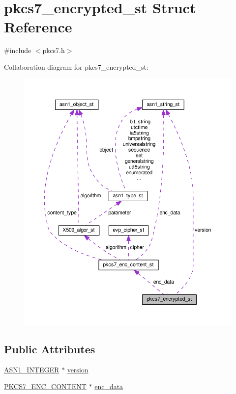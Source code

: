 \hypertarget{structpkcs7__encrypted__st}{}\section{pkcs7\+\_\+encrypted\+\_\+st Struct Reference}
\label{structpkcs7__encrypted__st}


{\ttfamily \#include $<$pkcs7.\+h$>$}



Collaboration diagram for pkcs7\+\_\+encrypted\+\_\+st\+:
\nopagebreak
\begin{figure}[H]
\begin{center}
\leavevmode
\includegraphics[width=350pt]{structpkcs7__encrypted__st__coll__graph}
\end{center}
\end{figure}
\subsection*{Public Attributes}
\begin{DoxyCompactItemize}
\item 
\hyperlink{ossl__typ_8h_af4335399bf9774cb410a5e93de65998b}{A\+S\+N1\+\_\+\+I\+N\+T\+E\+G\+ER} $\ast$ \hyperlink{structpkcs7__encrypted__st_a5c44f8bfad75a8a28e7690ca983f50ae}{version}
\item 
\hyperlink{pkcs7_8h_a4f2b044f01d16eb516f9027409e57d3a}{P\+K\+C\+S7\+\_\+\+E\+N\+C\+\_\+\+C\+O\+N\+T\+E\+NT} $\ast$ \hyperlink{structpkcs7__encrypted__st_ae9cf2da80ef23d3b5ae157898ff071a4}{enc\+\_\+data}
\end{DoxyCompactItemize}


